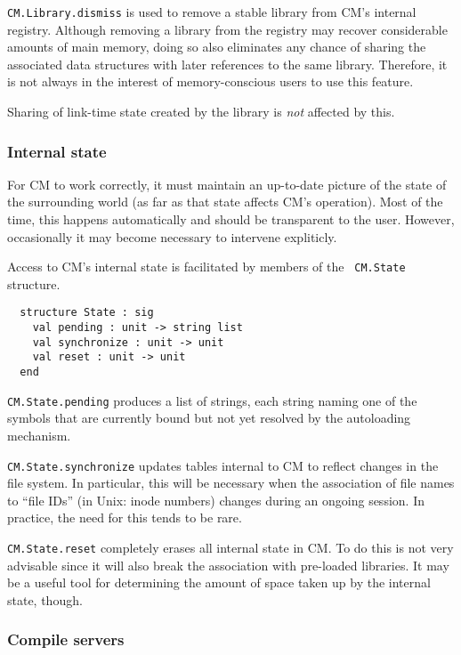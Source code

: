 \documentclass{article}
\begin{document}
{\tt CM.Library.dismiss} is used to remove a stable library from CM's
internal registry.  Although removing a library from the registry may
recover considerable amounts of main memory, doing so also eliminates
any chance of sharing the associated data structures with later
references to the same library.  Therefore, it is not always in the
interest of memory-conscious users to use this feature.

Sharing of link-time state created by the library is {\em not}
affected by this.

\subsubsection*{Internal state}

For CM to work correctly, it must maintain an up-to-date picture of
the state of the surrounding world (as far as that state affects CM's
operation).  Most of the time, this happens automatically and should be
transparent to the user.  However, occasionally it may become
necessary to intervene expliticly.

Access to CM's internal state is facilitated by members of the {\tt
CM.State} structure.

\begin{verbatim}
  structure State : sig
    val pending : unit -> string list
    val synchronize : unit -> unit
    val reset : unit -> unit
  end
\end{verbatim}

{\tt CM.State.pending} produces a list of strings, each string naming
one of the symbols that are currently bound but not yet resolved by
the autoloading mechanism.

{\tt CM.State.synchronize} updates tables internal to CM to reflect
changes in the file system.  In particular, this will be necessary
when the association of file names to ``file IDs'' (in Unix: inode
numbers) changes during an ongoing session.  In practice, the need for
this tends to be rare.

{\tt CM.State.reset} completely erases all internal state in CM.  To
do this is not very advisable since it will also break the association
with pre-loaded libraries.  It may be a useful tool for determining
the amount of space taken up by the internal state, though.

\subsubsection*{Compile servers}
\end{document}
